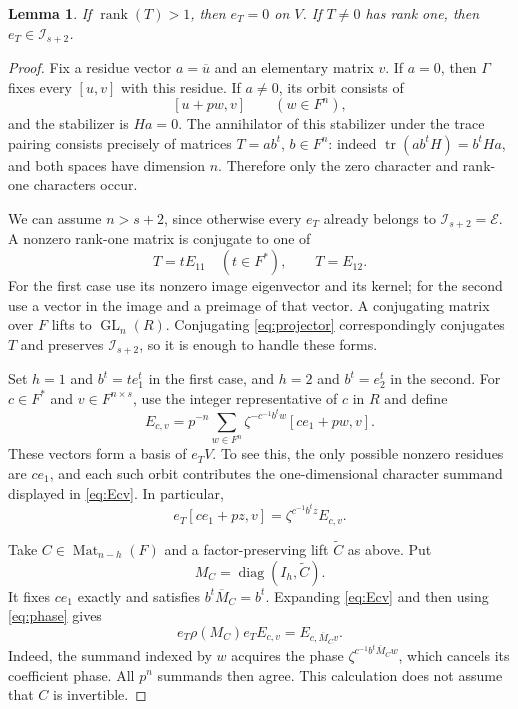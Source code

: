 \documentclass[11pt]{article}
\newtheorem{lemma}[theorem]{Lemma}
\theoremstyle{remark}\newtheorem{remark}[theorem]{Remark}
\newcommand{\Mat}{\operatorname{Mat}}
\newcommand{\GL}{\operatorname{GL}}
\newcommand{\tr}{\operatorname{tr}}
\newcommand{\rk}{\operatorname{rank}}
\begin{document}
\begin{lemma}\label{lem:rankone}
If $\rk(T)>1$, then $e_T=0$ on $V$. If $T\ne0$ has rank one, then $e_T\in\mathcal I_{s+2}$.
\end{lemma}
\begin{proof}
Fix a residue vector $a=\overline u$ and an elementary matrix $v$. If $a=0$, then $\Gamma$ fixes every $[u,v]$ with this residue. If $a\ne0$, its orbit consists of
\[
 [u+pw,v]\qquad(w\in F^n),
\]
and the stabilizer is $Ha=0$. The annihilator of this stabilizer under the trace pairing consists precisely of matrices $T=ab^t$, $b\in F^n$: indeed $\tr(ab^tH)=b^tHa$, and both spaces have dimension $n$. Therefore only the zero character and rank-one characters occur.

We can assume $n>s+2$, since otherwise every $e_T$ already belongs to $\mathcal I_{s+2}=\mathcal E$. A nonzero rank-one matrix is conjugate to one of
\[
 T=tE_{11}\quad(t\in F^*),\qquad T=E_{12}.
\]
For the first case use its nonzero image eigenvector and its kernel; for the second use a vector in the image and a preimage of that vector. A conjugating matrix over $F$ lifts to $\GL_n(R)$. Conjugating \eqref{eq:projector} correspondingly conjugates $T$ and preserves $\mathcal I_{s+2}$, so it is enough to handle these forms.

Set $h=1$ and $b^t=te_1^t$ in the first case, and $h=2$ and $b^t=e_2^t$ in the second. For $c\in F^*$ and $v\in F^{n\times s}$, use the integer representative of $c$ in $R$ and define
\begin{equation}\label{eq:Ecv}
 E_{c,v}=p^{-n}\sum_{w\in F^n}
    \zeta^{-c^{-1}b^tw}[ce_1+pw,v].
\end{equation}
These vectors form a basis of $e_TV$. To see this, the only possible nonzero residues are $ce_1$, and each such orbit contributes the one-dimensional character summand displayed in \eqref{eq:Ecv}. In particular,
\begin{equation}\label{eq:phase}
 e_T[ce_1+pz,v]=\zeta^{c^{-1}b^tz}E_{c,v}.
\end{equation}

Take $C\in\Mat_{n-h}(F)$ and a factor-preserving lift $\widetilde C$ as above. Put
\[
 M_C=\operatorname{diag}(I_h,\widetilde C).
\]
It fixes $ce_1$ exactly and satisfies $b^t\overline M_C=b^t$. Expanding \eqref{eq:Ecv} and then using \eqref{eq:phase} gives
\begin{equation}\label{eq:sandwich}
 e_T\rho(M_C)e_TE_{c,v}=E_{c,\overline M_Cv}.
\end{equation}
Indeed, the summand indexed by $w$ acquires the phase
$\zeta^{c^{-1}b^t\overline M_Cw}$, which cancels its coefficient phase. All $p^n$ summands then agree. This calculation does not assume that $C$ is invertible.


\end{proof}
\end{document}
